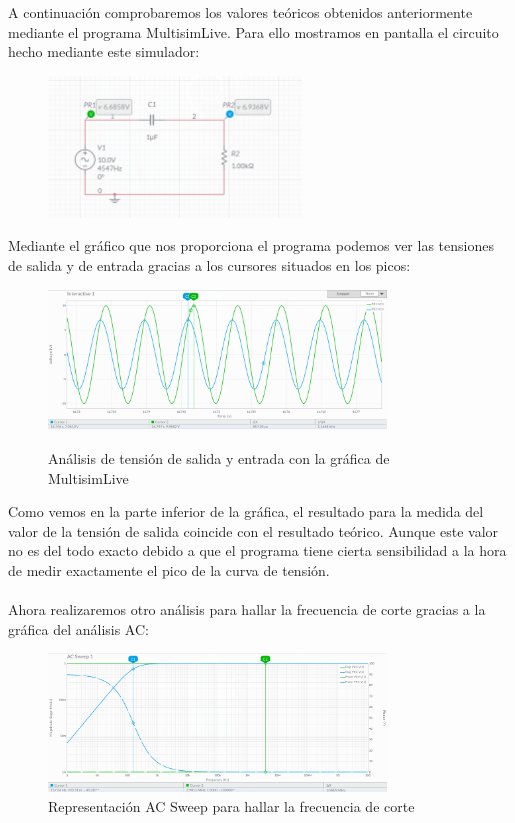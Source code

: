 \documentclass[11pt,letterpaper]{article}
\begin{document}
A continuación comprobaremos los valores teóricos obtenidos anteriormente mediante el programa MultisimLive. Para ello mostramos en pantalla el circuito hecho mediante este simulador:
\begin{figure}[H]
	\centering
	\includegraphics[width=0.6\textwidth]{imagen/circuitoRL_R.png}
\end{figure}
Mediante el gráfico que nos proporciona el programa podemos ver las tensiones de salida y de entrada gracias a los cursores situados en los picos:
\begin{figure}[H]
	\centering
	\includegraphics[width=0.8\textwidth]{imagen/analisispotenciales.png}
	\label{fig:analisispotencial-png}
	\caption{Análisis de tensión de salida y entrada con la gráfica de MultisimLive}
\end{figure}
Como vemos en la parte inferior de la gráfica, el resultado para la medida del valor de la tensión de salida coincide con el resultado teórico. Aunque este valor no es del todo exacto debido a que el programa tiene cierta sensibilidad a la hora de medir exactamente el pico de la curva de tensión.\\
\\
Ahora realizaremos otro análisis para hallar la frecuencia de corte gracias a la gráfica del análisis AC:
\begin{figure}[H]
	\centering
	\includegraphics[width=0.8\textwidth]{imagen/analisisAC.png}
	\caption{Representación AC Sweep para hallar la frecuencia de corte}
	\label{fig:imagen-analisisAC-png}
\end{figure}
\end{document}
